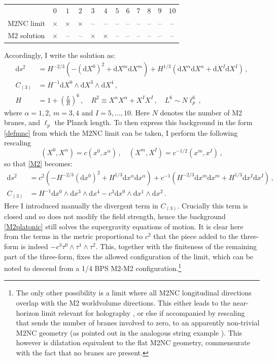 \documentclass[11pt]{article}
\newcommand{\be}{\begin{equation}}
\newcommand{\ee}{\end{equation}}
\newcommand{\dd}{\mathrm{d}}
\numberwithin{equation}{section}
\begin{document}
{{\begin{center}
\begin{tabular}{c|c|c|c|c|c|c|c|c|c|c|c|}
 & $0$ &  $1$ & $2$ & $3$ & $4$ & $5$ & $6$ & $7$ & $8$ & $9$ & ${10}$ \\
M2NC limit & $\times$ & $\times$&  $\times$ & --& --& --& --& --&-- &-- & -- \\
M2 solution & $\times$  &-- &-- &$\times$ & $\times$ &-- &-- &-- &-- & -- &--\\
\end{tabular}
\end{center}
\noindent Accordingly, I write the solution as:
\be
\label{M2}
\begin{split} 
\dd s^2  & = H^{-2/3} ( - (\dd X^0)^2 + \dd X^m \dd X^m ) 
+ H^{1/3} ( \dd X^\alpha \dd X^\alpha + \dd X^I \dd X^I )  \,,\\[4pt]
C_{(3)} & = H^{-1} \dd X^0 \wedge \dd X^3 \wedge \dd X^4 \,,\\[4pt]
H & = 1 + \left( \frac{L}{R} \right)^6 \,,\quad R^2 \equiv X^\alpha X^\alpha + X^I X^I \,,\quad  L^6 \sim N \ell_p^6 \,,
\end{split}
\ee
where $\alpha=1,2$, $m=3,4$ and $I=5,\dots,10$. Here $N$ denotes the number of M2 branes, and $\ell_p$ the Planck length.
To then express this background in the form \eqref{defmnc} from which the M2NC limit can be taken, I perform  the following rescaling 
\be
(X^0, X^\alpha) = c ( x^0, x^\alpha) \,,\quad
(X^m, X^I) = c^{-1/2} (x^m, x^I) \,,
\label{platonicmnc}
\ee
so that \eqref{M2} becomes:
\be
\label{M2platonic}
\begin{split} 
\dd s^2  & = 
c^2 \left(
- H^{-2/3} (\dd x^0)^2 + H^{1/3} \dd x^\alpha \dd x^\alpha
\right) 
+ c^{-1} \left( 
H^{-2/3} \dd x^m \dd x^m  
+ H^{1/3} \dd x^I \dd x^I \right)  \,,\\[4pt]
C_{(3)} & = H^{-1} \dd x^0 \wedge \dd x^3 \wedge \dd x^4 - c^3 \dd x^0 \wedge \dd x^1 \wedge \dd x^2 \,.
\end{split}
\ee
Here I introduced manually the divergent term in $C_{(3)}$.
Crucially this term is closed and so does not modify the field strength, hence the background \eqref{M2platonic} still solves the supergravity equations of motion. 
It is clear here from the terms in the metric proportional to $c^2$ that the piece added to the three-form is indeed $-c^3 \tau^0 \wedge \tau^1 \wedge \tau^2$.
This, together with the finiteness of the remaining part of the three-form, fixes the allowed configuration of the limit, which can be noted to descend from a 1/4 BPS M2-M2 configuration.\footnote{
The only other possibility is a limit where all M2NC longitudinal directions overlap with the M2 worldvolume directions.
This either leads to the near-horizon limit relevant for holography \cite{Blair:2024aqz}, or else
if accompanied by rescaling that sends the number of branes involved to zero, to an apparently non-trivial M2NC geometry (as pointed out in the analogous string example \cite{Avila:2023aey}).
This however is dilatation equivalent to the flat M2NC geometry, commensurate with the fact that no branes are present.}

}}
\end{document}

